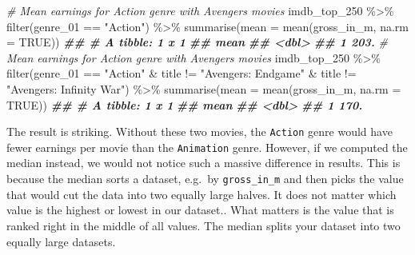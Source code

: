 \documentclass[
]{book}
\newenvironment{Shaded}{\begin{snugshade}}{\end{snugshade}}
\newcommand{\AttributeTok}[1]{\textcolor[rgb]{0.77,0.63,0.00}{#1}}
\newcommand{\CommentTok}[1]{\textcolor[rgb]{0.56,0.35,0.01}{\textit{#1}}}
\newcommand{\ConstantTok}[1]{\textcolor[rgb]{0.00,0.00,0.00}{#1}}
\newcommand{\DocumentationTok}[1]{\textcolor[rgb]{0.56,0.35,0.01}{\textbf{\textit{#1}}}}
\newcommand{\FunctionTok}[1]{\textcolor[rgb]{0.00,0.00,0.00}{#1}}
\newcommand{\NormalTok}[1]{#1}
\newcommand{\SpecialCharTok}[1]{\textcolor[rgb]{0.00,0.00,0.00}{#1}}
\newcommand{\StringTok}[1]{\textcolor[rgb]{0.31,0.60,0.02}{#1}}
\begin{document}
\begin{Shaded}
\begin{Highlighting}[]
\CommentTok{\# Mean earnings for Action genre with Avengers movies}
\NormalTok{imdb\_top\_250 }\SpecialCharTok{\%\textgreater{}\%}
  \FunctionTok{filter}\NormalTok{(genre\_01 }\SpecialCharTok{==} \StringTok{"Action"}\NormalTok{) }\SpecialCharTok{\%\textgreater{}\%}
  \FunctionTok{summarise}\NormalTok{(}\AttributeTok{mean =} \FunctionTok{mean}\NormalTok{(gross\_in\_m, }\AttributeTok{na.rm =} \ConstantTok{TRUE}\NormalTok{))}
\DocumentationTok{\#\# \# A tibble: 1 x 1}
\DocumentationTok{\#\#    mean}
\DocumentationTok{\#\#   \textless{}dbl\textgreater{}}
\DocumentationTok{\#\# 1  203.}
\CommentTok{\# Mean earnings for Action genre with Avengers movies}
\NormalTok{imdb\_top\_250 }\SpecialCharTok{\%\textgreater{}\%}
  \FunctionTok{filter}\NormalTok{(genre\_01 }\SpecialCharTok{==} \StringTok{"Action"} \SpecialCharTok{\&}
\NormalTok{           title }\SpecialCharTok{!=} \StringTok{"Avengers: Endgame"} \SpecialCharTok{\&}
\NormalTok{           title }\SpecialCharTok{!=} \StringTok{"Avengers: Infinity War"}\NormalTok{) }\SpecialCharTok{\%\textgreater{}\%}
  \FunctionTok{summarise}\NormalTok{(}\AttributeTok{mean =} \FunctionTok{mean}\NormalTok{(gross\_in\_m, }\AttributeTok{na.rm =} \ConstantTok{TRUE}\NormalTok{))}
\DocumentationTok{\#\# \# A tibble: 1 x 1}
\DocumentationTok{\#\#    mean}
\DocumentationTok{\#\#   \textless{}dbl\textgreater{}}
\DocumentationTok{\#\# 1  170.}
\end{Highlighting}
\end{Shaded}

The result is striking. Without these two movies, the \texttt{Action} genre would have fewer earnings per movie than the \texttt{Animation} genre. However, if we computed the median instead, we would not notice such a massive difference in results. This is because the median sorts a dataset, e.g.~by \texttt{gross\_in\_m} and then picks the value that would cut the data into two equally large halves. It does not matter which value is the highest or lowest in our dataset.. What matters is the value that is ranked right in the middle of all values. The median splits your dataset into two equally large datasets.
\end{document}
